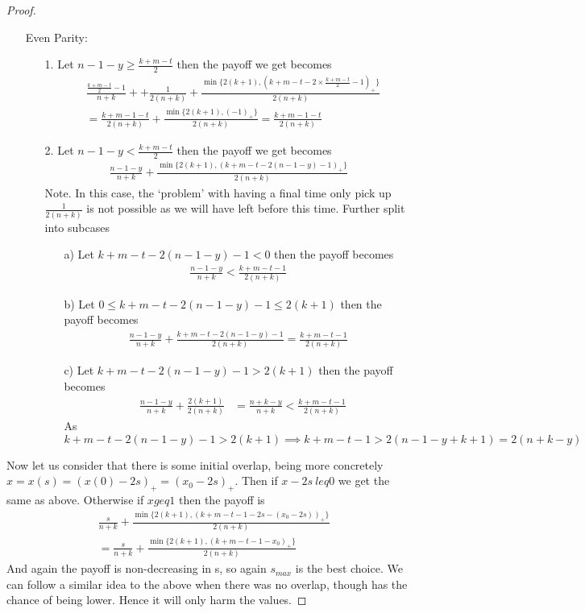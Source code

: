 \documentclass[a4paper,10pt]{article}
\newcommand{\pospart}[1]{\left( #1 \right)_{+}}
\theoremstyle{definition}
\theoremstyle{definition}
\theoremstyle{remark}
\theoremstyle{definition}
\begin{document}
\begin{proof}
\begin{itemize}
\item[Even Parity:]
\begin{itemize}
\item[1.]Let $n-1-y \geq \frac{k+m-t}{2}$ then the payoff we get becomes
\begin{align*}
&\frac{\frac{k+m-t}{2}-1}{n+k}+ +\frac{1}{2(n+k)}+\frac{\min \{ 2(k+1),\pospart{k+m-t-2 \times \frac{k+m-t}{2} -1} \}}{2(n+k)} \\
&=\frac{k+m-1-t}{2(n+k)} +\frac{\min \{ 2(k+1),\pospart{-1} \}}{2(n+k)}
=\frac{k+m-1-t}{2(n+k)}
\end{align*}
\item[2.]Let $n-1-y < \frac{k+m-t}{2}$ then the payoff we get becomes
\begin{align*}
\frac{n-1-y}{n+k}+\frac{\min \{ 2(k+1),\pospart{k+m-t-2(n-1-y)-1} \}}{2(n+k)}
\end{align*}
Note. In this case, the `problem' with having a final time only pick up $\frac{1}{2(n+k)}$ is not possible as we will have left before this time.
Further split into subcases
\begin{itemize}
\item[a)]Let $k+m-t-2(n-1-y)-1<0$ then the payoff becomes
\begin{align*}
\frac{n-1-y}{n+k}<\frac{k+m-t-1}{2(n+k)}
\end{align*}
\item[b)]Let $0 \leq k+m-t-2(n-1-y)-1 \leq 2(k+1)$ then the payoff becomes
\begin{align*}
\frac{n-1-y}{n+k} +\frac{k+m-t-2(n-1-y)-1}{2(n+k)}=\frac{k+m-t-1}{2(n+k)}
\end{align*}
\item[c)]Let $k+m-t-2(n-1-y)-1 > 2(k+1)$ then the payoff becomes
\begin{align*}
&\frac{n-1-y}{n+k}+\frac{2(k+1)}{2(n+k)}
&=\frac{n+k-y}{n+k} < \frac{k+m-t-1}{2(n+k)}
\end{align*}
As $k+m-t-2(n-1-y)-1 > 2(k+1) \implies k+m-t-1 > 2(n-1-y+k+1)=2(n+k-y)$
\end{itemize}
\end{itemize}
\end{itemize}

Now let us consider that there is some initial overlap, being more concretely $x=x(s)=\pospart{x(0)-2s}=\pospart{x_{0}-2s}$. Then if $x-2s\ leq 0$ we get the same as above.
Otherwise if $x geq 1$ then the payoff is
\begin{align*}
&\frac{s}{n+k}+\frac{\min \{ 2(k+1),\pospart{k+m-t-1-2s-(x_{0}-2s)} \}}{2(n+k)}\\
&=\frac{s}{n+k}+\frac{\min \{ 2(k+1),\pospart{k+m-t-1-x_{0}} \}}{2(n+k)}
\end{align*}
And again the payoff is non-decreasing in s, so again $s_{max}$ is the best choice.
We can follow a similar idea to the above when there was no overlap, though has the chance of being lower. Hence it will only harm the values.


\end{proof}
\end{document}
